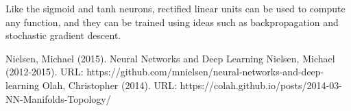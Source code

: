 \documentclass[12 pt]{article}
\begin{document}
Like the sigmoid and tanh neurons, rectified linear units can be used to
compute any function, and they can be trained using ideas such as
backpropagation and stochastic gradient descent.
\newpage
\begin{thebibliography}{99}
Nielsen, Michael (2015). Neural Networks and Deep Learning
Nielsen, Michael (2012-2015). URL: https://github.com/mnielsen/neural-networks-and-deep-learning
Olah, Christopher (2014). URL: https://colah.github.io/posts/2014-03-NN-Manifolds-Topology/
\end{thebibliography}
\end{document}
